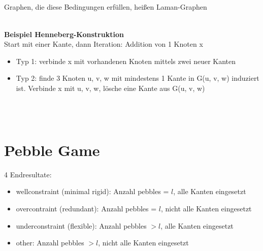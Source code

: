 \documentclass[12pt,a4paper]{article}
\begin{document}
\\\\
\\\\
Graphen, die diese Bedingungen erfüllen, heißen Laman-Graphen
\\\\
\parbox{\linewidth}{\textbf{Beispiel Henneberg-Konstruktion}\\
Start mit einer Kante, dann Iteration: Addition von 1 Knoten x
\begin{itemize}
	\item Typ 1: verbinde x mit  vorhandenen Knoten mittels zwei neuer Kanten
	\item Typ 2: finde 3 Knoten u, v, w mit mindestens 1 Kante in G(u, v, w) induziert ist. Verbinde x mit u, v, w, lösche eine Kante aus G(u, v, w)
\end{itemize}
}
\\\\

\section{Pebble Game}
4 Endresultate:
\begin{itemize}
	\item wellconstraint (minimal rigid): Anzahl pebbles = $l$, alle Kanten eingesetzt
	\item overcontraint (redundant): Anzahl pebbles = $l$, nicht alle Kanten eingesetzt
	\item underconstraint (flexible): Anzahl pebbles $>l$, alle Kanten eingesetzt
	\item other: Anzahl pebbles $>l$, nicht alle Kanten eingesetzt
\end{itemize}
\end{document}
